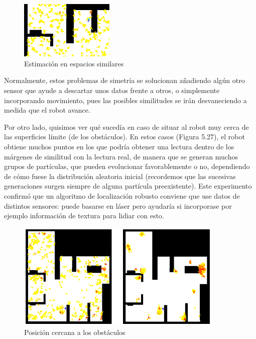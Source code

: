 \begin{figure}[H]
	\begin{center}
		\includegraphics[width=0.4\textwidth]{figures/similaroutput.png}
		\caption{Estimación en espacios similares}
		\label{fig.similaroutput}
		\end{center}
\end{figure}

Normalmente, estos problemas de simetría se solucionan añadiendo algún otro sensor que ayude a descartar unos datos frente a otros, o simplemente incorporando movimiento, pues las posibles similitudes se irán desvaneciendo a medida que el robot avance.

Por otro lado, quisimos ver qué sucedía en caso de situar al robot muy cerca de las superficies límite (de los obstáculos). En estos casos (Figura 5.27), el robot obtiene muchos puntos en los que podría obtener una lectura dentro de los márgenes de similitud con la lectura real, de manera que se generan muchos grupos de partículas, que pueden evolucionar favorablemente o no, dependiendo de cómo fuese la distribución aleatoria inicial (recordemos que las sucesivas generaciones surgen siempre de alguna partícula preexistente). Este experimento confirmó que un algoritmo de localización robusto conviene que use datos de distintos sensores: puede basarse en láser pero ayudaría si incorporase por ejemplo información de textura para lidiar con esto.

\begin{figure}[H]
	\begin{center}
		\includegraphics[width=0.88\textwidth]{figures/estampado.png}
		\caption{Posición cercana a los obstáculos}
		\label{fig.estampado}
		\end{center}
\end{figure}

